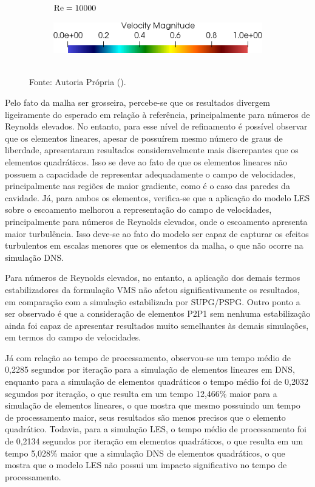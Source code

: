 \begin{figure}[h!]
\begin{subfigure}{0.32\textwidth}
        \caption{$\mathrm{Re}=10000$}
    \end{subfigure}
    \begin{subfigure}{0.4\textwidth}
        \includegraphics[width=\linewidth]{Figuras/Cavity/legenda.png}
    \end{subfigure}
    \\Fonte: Autoria Própria (\the\year).
    \label{fig:cavity-results2}
\end{figure}

Pelo fato da malha ser grosseira, percebe-se que os resultados divergem ligeiramente do esperado em relação à referência, principalmente para números de Reynolds elevados. No entanto, para esse nível de refinamento é possível observar que os elementos lineares, apesar de possuírem mesmo número de graus de liberdade, apresentaram resultados consideravelmente mais discrepantes que os elementos quadráticos. Isso se deve ao fato de que os elementos lineares não possuem a capacidade de representar adequadamente o campo de velocidades, principalmente nas regiões de maior gradiente, como é o caso das paredes da cavidade. Já, para ambos os elementos, verifica-se que a aplicação do modelo LES sobre o escoamento melhorou a representação do campo de velocidades, principalmente para números de Reynolds elevados, onde o escoamento apresenta maior turbulência. Isso deve-se ao fato do modelo ser capaz de capturar os efeitos turbulentos em escalas menores que os elementos da malha, o que não ocorre na simulação DNS.

Para números de Reynolds elevados, no entanto, a aplicação dos demais termos estabilizadores da formulação VMS não afetou significativamente os resultados, em comparação com a simulação estabilizada por SUPG/PSPG. Outro ponto a ser observado é que a consideração de elementos P2P1 sem nenhuma estabilização ainda foi capaz de apresentar resultados muito semelhantes às demais simulações, em termos do campo de velocidades.

Já com relação ao tempo de processamento, observou-se um tempo médio de 0,2285 segundos por iteração para a simulação de elementos lineares em DNS, enquanto para a simulação de elementos quadráticos o tempo médio foi de 0,2032 segundos por iteração, o que resulta em um tempo 12,466\% maior para a simulação de elementos lineares, o que mostra que mesmo possuindo um tempo de processamento maior, seus resultados são menos precisos que o elemento quadrático. Todavia, para a simulação LES, o tempo médio de processamento foi de 0,2134 segundos por iteração em elementos quadráticos, o que resulta em um tempo 5,028\% maior que a simulação DNS de elementos quadráticos, o que mostra que o modelo LES não possui um impacto significativo no tempo de processamento.

